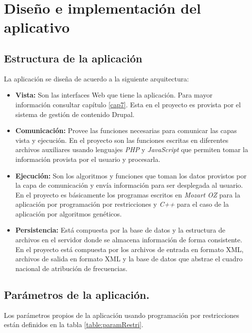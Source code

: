 \section{Diseño e implementación del aplicativo}

\subsection{Estructura de la aplicación}

La aplicación se diseña de acuerdo a la siguiente arquitectura:

\begin{itemize}
	\item \textbf{Vista:} Son las interfaces Web que tiene la aplicación. Para mayor información consultar capítulo \ref{cap7}. Esta en el proyecto es provista por el sistema de gestión de contenido Drupal\cite{Drupal}.
	\item \textbf{Comunicación:} Provee las funciones necesarias para comunicar las capas vista y ejecución. En el proyecto son las funciones escritas en diferentes archivos auxiliares usando lenguajes \textit{PHP} y \textit{JavaScript} que permiten tomar la información provista por el usuario y procesarla.
	\item \textbf{Ejecución:} Son los algoritmos y funciones que toman los datos provistos por la capa de comunicación y envía información para ser desplegada al usuario. En el proyecto es básicamente los programas escritos en \textit{Mozart OZ}\cite{MozartWeb} para la aplicación por programación por restricciones y \textit{C++} para el caso de la aplicación por algoritmos genéticos.
	\item \textbf{Persistencia:} Está compuesta por la base de datos y la estructura de archivos en el servidor donde se almacena información de forma consistente. En el proyecto está compuesta por los archivos de entrada en formato XML, archivos de salida en formato XML y la base de datos que abstrae el cuadro nacional de atribución de frecuencias.
\end{itemize}

\subsection{Parámetros de la aplicación.}

Los parámetros propios de la aplicación usando programación por restricciones están definidos en la tabla \ref{table:paramRestri}.

